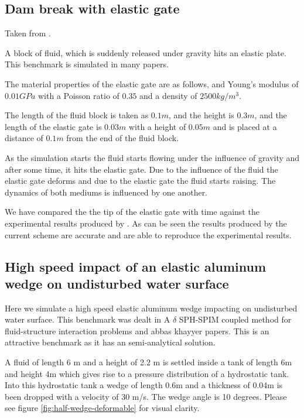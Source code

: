 \documentclass[preprint,12pt]{elsarticle}
\begin{document}
\subsection{Dam break with elastic gate}
\label{sec:dam-break-elastic-gate}

Taken from \citet{sun2019fully, ng2020coupled}.

A block of fluid, which is suddenly released under gravity hits an elastic
plate. This benchmark is simulated in many papers.

The material properties of the elastic gate are as follows, and Young's
modulus of $0.01 GPa$ with a Poisson ratio of $0.35$ and a density of
$2500 kg/m^3$.

The length of the fluid block is taken as $0.1m$, and the height is $0.3m$,
and the length of the elastic gate is $0.03m$ with a height of $0.05m$ and is
placed at a distance of $0.1m$ from the end of the fluid block.


As the simulation starts the fluid starts flowing under the influence of
gravity and after some time, it hits the elastic gate. Due to the influence of
the fluid the elastic gate deforms and due to the elastic gate the fluid
starts raising. The dynamics of both mediums is influenced by one another.


We have compared the the tip of the elastic gate with time against the
experimental results produced by \cite{xxx}. As can be seen the results
produced by the current scheme are accurate and are able to reproduce the
experimental results.



\subsection{High speed impact of an elastic aluminum wedge on undisturbed
  water surface}
\label{sec:wedge-impact-on-water}

Here we simulate a high speed elastic aluminum wedge impacting on undisturbed
water surface. This benchmark was dealt in
{A $\delta$ SPH-SPIM coupled method for fluid-structure interaction problems} and
{abbas khayyer} papers.
This is an attractive benchmark as it has an semi-analytical solution.

A fluid of length 6 m and a height of 2.2 m is settled inside a tank of length
6m and height 4m which gives rise to a pressure distribution of a hydrostatic
tank. Into this hydrostatic tank a wedge of length 0.6m and a thickness of
0.04m is been dropped with a velocity of 30 m/s. The wedge angle is 10
degrees. Please see figure \ref{fig:half-wedge-deformable} for visual clarity.
\end{document}
